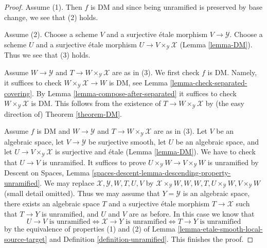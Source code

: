 \documentclass[10pt,a4paper]{amsart}
\theoremstyle{plain}
\theoremstyle{definition}
\theoremstyle{remark}
\numberwithin{equation}{subsection}
\begin{document}
\begin{proof}
Assume (1). Then $f$ is DM and since being unramified is preserved
by base change, we see that (2) holds.

\medskip\noindent
Assume (2). Choose a scheme $V$ and a surjective \'etale morphism
$V \to \mathcal{Y}$. Choose a scheme $U$ and a surjective \'etale morphism
$U \to V \times_\mathcal{Y} \mathcal{X}$ (Lemma \ref{lemma-DM}).
Thus we see that (3) holds.

\medskip\noindent
Assume $W \to \mathcal{Y}$ and $T \to W \times_\mathcal{Y} \mathcal{X}$
are as in (3). We first check $f$ is DM. Namely, it suffices to check
$W \times_\mathcal{Y} \mathcal{X} \to W$ is DM, see
Lemma \ref{lemma-check-separated-covering}.
By Lemma \ref{lemma-compose-after-separated}
it suffices to check $W \times_\mathcal{Y} \mathcal{X}$ is DM.
This follows from the existence of $T \to W \times_\mathcal{Y} \mathcal{X}$
by (the easy direction of) Theorem \ref{theorem-DM}.

\medskip\noindent
Assume $f$ is DM and $W \to \mathcal{Y}$ and
$T \to W \times_\mathcal{Y} \mathcal{X}$ are as in (3).
Let $V$ be an algebraic space, let $V \to \mathcal{Y}$ be surjective smooth,
let $U$ be an algebraic space, and let
$U \to V \times_\mathcal{Y} \mathcal{X}$ is surjective and \'etale
(Lemma \ref{lemma-DM}). We have to check that $U \to V$ is unramified.
It suffices to prove $U \times_\mathcal{Y} W \to V \times_\mathcal{Y} W$
is unramified by Descent on Spaces, Lemma
\ref{spaces-descent-lemma-descending-property-unramified}.
We may replace $\mathcal{X}, \mathcal{Y}, W, T, U, V$ by
$\mathcal{X} \times_\mathcal{Y} W, W, W, T, U \times_\mathcal{Y} W,
V \times_\mathcal{Y} W$ (small detail omitted).
Thus we may assume that $Y = \mathcal{Y}$ is an algebraic space, there exists
an algebraic space $T$ and a surjective \'etale morphism
$T \to \mathcal{X}$ such that $T \to Y$ is unramified, and $U$ and $V$
are as before. In this case we know that
$$
U \to V\text{ is unramified}
\Leftrightarrow
\mathcal{X} \to Y\text{ is unramified}
\Leftrightarrow
T \to Y\text{ is unramified}
$$
by the equivalence of properties (1) and (2) of
Lemma \ref{lemma-etale-smooth-local-source-target}
and Definition \ref{definition-unramified}.
This finishes the proof.
\end{proof}
\end{document}
